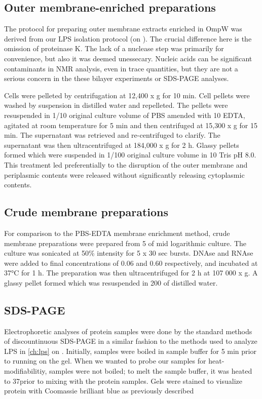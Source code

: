 \subsection{Outer membrane-enriched preparations}
\label{sub:porin_omp_prep}
The protocol for preparing outer membrane extracts enriched in OmpW was derived from our \ac{LPS} isolation protocol (on ). The crucial difference here is the omission of proteinase K. The lack of a nuclease step was primarily for convenience, but also it was deemed unessecary. Nucleic acids can be significant contaminants in \ac{NMR} analysis, even in trace quantities, but they are not a serious concern in the these bilayer  experiments or \ac{SDS-PAGE} analyses.

Cells were pelleted by centrifugation at 12,400 x g for 10 min. Cell pellets were washed by suspension in distilled water and repelleted. The pellets were resuspended in 1/10 original culture volume of \ac{PBS} amended with 10 \millimolar{} \ac{EDTA}, agitated at room temperature for 5 min and then centrifuged at 15,300 x g for 15 min. The supernatant was retrieved and re-centrifuged to clarify. The supernatant was then ultracentrifuged at 184,000 x g for 2 h. Glassy pellets formed which were suspended in 1/100 original culture volume in 10 \millimolar Tris pH 8.0. This treatment led preferentially to the disruption of the outer membrane and periplasmic contents were released without significantly releasing cytoplasmic contents.

\subsection{Crude membrane preparations}
    \label{sub:porin_crude_preps}
    For comparison to the \ac{PBS}-\ac{EDTA} membrane enrichment method, crude membrane preparations were prepared from 5 \millilitre of mid logarithmic culture. The culture was sonicated at 50\% intensity for 5 x 30 sec bursts. DNAse and RNAse were added to final concentrations of 0.06 \mgperml and 0.60 \mgperml respectively, and incubated at 37\si{\degreeCelsius} for 1 h. The preparation was then ultracentrifuged for 2 h at 107 000 x g. A glassy pellet formed which was resuspended in 200 \microlitre of distilled water.

\subsection{\Acl{SDS-PAGE}} \label{sec:porin-sds-page}
Electrophoretic analyses of protein samples were done by the standard methods of discountinuous \ac{SDS-PAGE} in a similar fashion to the methods used to analyze \ac{LPS} in \cref{ch:lps} on . Initially, samples were boiled in sample buffer for 5 min prior to running on the gel. When we wanted to probe our samples for heat-modifiabilitiy, samples were not boiled; to melt the sample buffer, it was heated to 37\cel prior to mixing with the protein samples. Gels were stained to visualize protein with Coomassie brilliant blue as previously described

